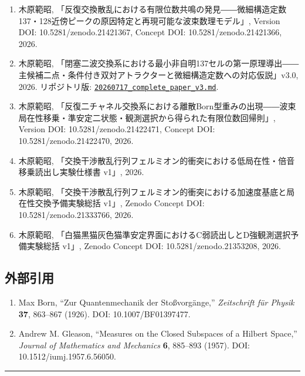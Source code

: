 \documentclass[
  a4paper,
  10pt]{article}
\providecommand{\tightlist}{%
  \setlength{\itemsep}{0pt}\setlength{\parskip}{0pt}}
\begin{document}
\begin{enumerate}
\def\labelenumi{\arabic{enumi}.}
\tightlist
\item
  木原範昭,
  「反復交換散乱における有限位数共鳴の発見――微細構造定数137・128近傍ピークの原因特定と再現可能な波束数理モデル」,
  Version DOI: 10.5281/zenodo.21421367, Concept DOI:
  10.5281/zenodo.21421366, 2026.
\item
  木原範昭,
  「閉塞二波交換系における最小非自明137セルの第一原理導出――主候補二点・条件付き双対アトラクターと微細構造定数への対応仮説」v3.0,
  2026. リポジトリ版:
  \href{../20260717/20260717_complete_paper_v3.md}{\texttt{20260717\_complete\_paper\_v3.md}}.
\item
  木原範昭,
  「反復二チャネル交換系における離散Born型重みの出現――波束局在性移乗・準安定二状態・観測選択から得られた有限位数回帰則」,
  Version DOI: 10.5281/zenodo.21422471, Concept DOI:
  10.5281/zenodo.21422470, 2026.
\item
  木原範昭,
  「交換干渉散乱行列フェルミオン的衝突における低局在性・倍音移乗読出し実験仕様書
  v1」, 2026.
\item
  木原範昭,
  「交換干渉散乱行列フェルミオン的衝突における加速度基底と局在性交換予備実験総括
  v1」, Zenodo Concept DOI: 10.5281/zenodo.21333766, 2026.
\item
  木原範昭,
  「白猫黒猫灰色猫準安定界面におけるC弱読出しとD強観測選択予備実験総括
  v1」, Zenodo Concept DOI: 10.5281/zenodo.21353208, 2026.
\end{enumerate}

\subsection{外部引用}\label{ux5916ux90e8ux5f15ux7528}

\begin{enumerate}
\def\labelenumi{\arabic{enumi}.}
\setcounter{enumi}{6}
\tightlist
\item
  Max Born, ``Zur Quantenmechanik der Stoßvorgänge,'' \emph{Zeitschrift
  für Physik} \textbf{37}, 863--867 (1926). DOI: 10.1007/BF01397477.
\item
  Andrew M. Gleason, ``Measures on the Closed Subspaces of a Hilbert
  Space,'' \emph{Journal of Mathematics and Mechanics} \textbf{6},
  885--893 (1957). DOI: 10.1512/iumj.1957.6.56050.
\end{enumerate}

\begin{center}\rule{0.5\linewidth}{0.5pt}\end{center}
\end{document}
